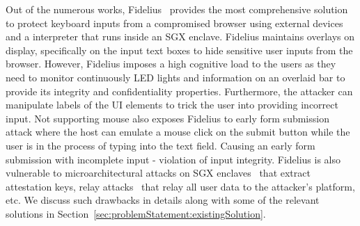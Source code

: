 Out of the numerous works, Fidelius~\cite{Fidelius} provides the most comprehensive solution to protect keyboard inputs from a compromised browser using external devices and a \js interpreter that runs inside an SGX enclave. Fidelius maintains overlays on display, specifically on the input text boxes to hide sensitive user inputs from the browser. 
However, Fidelius imposes a high cognitive load to the users as they need to monitor continuously LED lights and information on an overlaid bar to provide its integrity and confidentiality properties. Furthermore, the attacker can manipulate labels of the UI elements to trick the user into providing incorrect input. Not supporting mouse also exposes Fidelius to early form submission attack where the host can emulate a mouse click on the submit button while the user is in the process of typing into the text field. Causing an early form submission with incomplete input - violation of input integrity. Fidelius is also vulnerable to  microarchitectural attacks on SGX enclaves~\cite{van2018foreshadow} that extract attestation keys, relay attacks~\cite{dhar2018proximitee} that relay all user data to the attacker's platform, etc.
We discuss such drawbacks in details along with some of the relevant solutions in Section~\ref{sec:problemStatement:existingSolution}.


